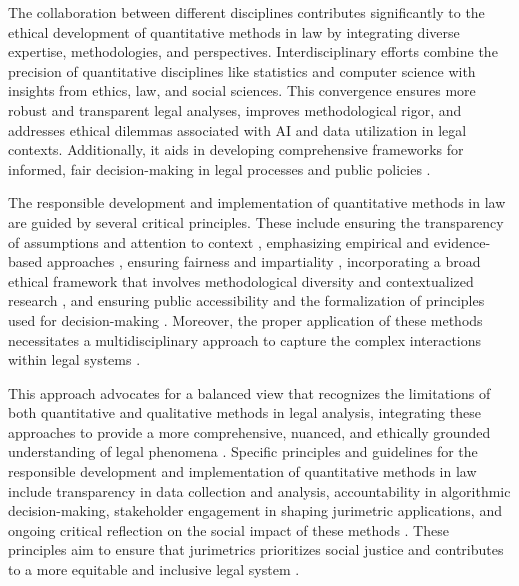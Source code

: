 The collaboration between different disciplines contributes significantly to the ethical development of quantitative methods in law by integrating diverse expertise, methodologies, and perspectives. Interdisciplinary efforts combine the precision of quantitative disciplines like statistics and computer science with insights from ethics, law, and social sciences. This convergence ensures more robust and transparent legal analyses, improves methodological rigor, and addresses ethical dilemmas associated with AI and data utilization in legal contexts. Additionally, it aids in developing comprehensive frameworks for informed, fair decision-making in legal processes and public policies \cite{di2023, ribeiro2021, massuanganhe2016, sareen2020, saltelli2020}.

The responsible development and implementation of quantitative methods in law are guided by several critical principles. These include ensuring the transparency of assumptions and attention to context \cite{di2023}, emphasizing empirical and evidence-based approaches \cite{nunes2018_pages_116-118}, ensuring fairness and impartiality \cite{ribeiro2021_pages_3-3, silva2023}, incorporating a broad ethical framework that involves methodological diversity and contextualized research \cite{sareen2020}, and ensuring public accessibility and the formalization of principles used for decision-making \cite{massuanganhe2016}. Moreover, the proper application of these methods necessitates a multidisciplinary approach to capture the complex interactions within legal systems \cite{di2023}.

This approach advocates for a balanced view that recognizes the limitations of both quantitative and qualitative methods in legal analysis, integrating these approaches to provide a more comprehensive, nuanced, and ethically grounded understanding of legal phenomena \cite{10.1590/data.2022.65.3.267,10.1057/s41599-020-0396-5}. Specific principles and guidelines for the responsible development and implementation of quantitative methods in law include transparency in data collection and analysis, accountability in algorithmic decision-making, stakeholder engagement in shaping jurimetric applications, and ongoing critical reflection on the social impact of these methods \cite{10.1590/data.2022.65.3.267,10.1057/s41599-020-0396-5}. These principles aim to ensure that jurimetrics prioritizes social justice and contributes to a more equitable and inclusive legal system \cite{10.1590/data.2022.65.3.267,10.1057/s41599-020-0396-5}.

